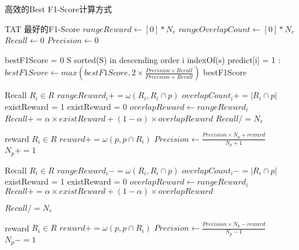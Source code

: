   \begin{breakablealgorithm}
    \caption{高效的Best F1-Score计算方式}
    \begin{algorithmic}[1]
      \Require TAT
      \Ensure 最好的F1-Score
      \State $rangeReward \gets [0] * N_r$
      \State $rangeOverlapCount \gets [0] * N_r$
      \State $Recall \gets 0$
      \State $Precision \gets 0$

      \State

      \State bestF1Score = 0
      \State S \gets sorted(S) in descending order
      \State i \gets indexOf(s)
      \State predict[i] = 1
          \State {}
          \State {}
      \EndIf
      :
          \State {}
          \State {}
      \EndIf
      \State $bestF1Score \gets max(bestF1Score, 2\times\frac{Precision \times Recall}{Precision + Recall})$
      \EndFor
      \State \Return bestF1Score
      \EndFunction
      
      \State

      \State Recall 
      \ForAll $R_i \in R$
            \State $rangeReward_i += \omega(R_i,R_i \cap p)$
            \State $overlapCount_i += |R_i\cap p|$
              \State existReward = 1
            \Else
              \State existReward = 0
            \EndIf
            \State $overlapReward \gets rangeReward_i$
            \State $Recall += \alpha \times existReward + (1-\alpha) \times overlapReward$
      \EndFor
      \State $Recall /= N_r$

      \State

      \State reward 
      \ForAll $R_i \in R$
            \State $reward += \omega(p, p \cap R_i)$
      \EndFor
      \State $Precision \gets \frac{Precision \times N_p + reward}{N_p + 1}$
      \State $N_p += 1$
      \EndFunction

      \State

      \State Recall 
      \ForAll $R_i \in R$
            \State $rangeReward_i -= \omega(R_i,R_i \cap p)$
            \State $overlapCount_i -= |R_i\cap p|$
              \State existReward = 1
            \Else
              \State existReward = 0
            \EndIf
            \State $overlapReward \gets rangeReward_i$
            \State $Recall += \alpha \times existReward + (1-\alpha) \times overlapReward$
      \EndFor

      \State

      \State $Recall /= N_r$

      \State reward 
      \ForAll $R_i \in R$
            \State $reward += \omega(p, p \cap R_i)$
      \EndFor
      \State $Precision \gets \frac{Precision \times N_p - reward}{N_p - 1}$
      \State $N_p -= 1$
      \EndFunction
    \end{algorithmic}
  \end{breakablealgorithm}
